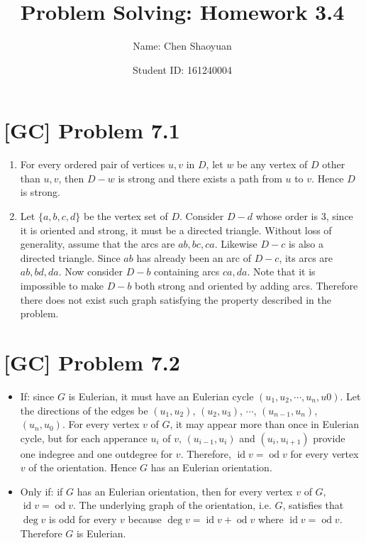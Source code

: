 \documentclass[a4paper,11pt,twocolumn]{article}
\newcommand{\homeworkno}{3.4}
\newcommand{\id}{\mathop{\mathrm{id}}}
\newcommand{\od}{\mathop{\mathrm{od}}}
\begin{document}
  \title{Problem Solving: Homework \homeworkno}
  \author{Name: Chen Shaoyuan \and Student ID: 161240004}
  \maketitle

  \section{[GC] Problem 7.1}
  \begin{enumerate}
  	\item For every ordered pair of vertices $u, v$ in $D$, let $w$ be any vertex of $D$ other than $u, v$, then $D-w$ is strong and there exists a path from $u$ to $v$. Hence $D$ is strong.
  	\item Let $\{a, b, c, d\}$ be the vertex set of $D$. Consider $D-d$ whose order is 3, since it is oriented and strong, it must be a directed triangle. Without loss of generality, assume that the arcs are $ab, bc, ca$. Likewise $D-c$ is also a directed triangle. Since $ab$ has already been an arc of $D-c$, its arcs are $ab, bd, da$. Now consider $D-b$ containing arcs $ca, da$. Note that it is impossible to make $D-b$ both strong and oriented by adding arcs. Therefore there does not exist such graph satisfying the property described in the problem.
  \end{enumerate}
  	
  \section{[GC] Problem 7.2}
  \begin{itemize}
    \item If: since $G$ is Eulerian, it must have an Eulerian cycle $(u_1, u_2, \cdots, u_n, u0)$. Let the directions of the edges be $(u_1, u_2)$, $(u_2, u_3)$, $\cdots$, $(u_{n-1}, u_n)$, $(u_n, u_0)$. For every vertex $v$ of $G$, it may appear more than once in Eulerian cycle, but for each apperance $u_i$ of $v$, $(u_{i-1}, u_i)$ and $(u_i, u_{i+1})$ provide one indegree and one outdegree for $v$. Therefore, $\id{v} = \od{v}$ for every vertex $v$ of the orientation. Hence $G$ has an Eulerian orientation. 
    \item Only if: if $G$ has an Eulerian orientation, then for every vertex $v$ of $G$, $\id{v} = \od{v}$. The underlying graph of the orientation, i.e. $G$, satisfies that $\deg{v}$ is odd for every $v$ because $\deg{v} = \id{v} + \od{v}$ where $\id{v} = \od{v}$. Therefore $G$ is Eulerian.
  \end{itemize}  
  
\end{document}
